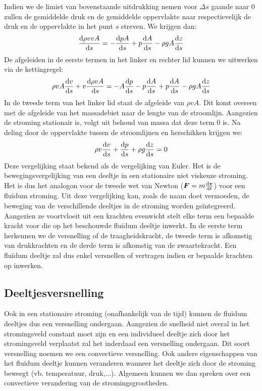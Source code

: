 Indien we de limiet van bovenstaande uitdrukking nemen voor $\Delta s$ gaande naar $0$ zullen de gemiddelde druk en de gemiddelde oppervlakte naar respectievelijk de druk en de oppervlakte in het punt $s$ streven. We krijgen dan:
\begin{equation}
	\frac{\mathrm{d} \rho v v A}{\mathrm{d} s} = -\frac{\mathrm{d} p A}{\mathrm{d} s} + p \frac{\mathrm{d} A}{\mathrm{d} s} -\rho g A \frac{\mathrm{d} z}{\mathrm{d} s}
\end{equation}
De afgeleiden in de eerste termen in het linker en rechter lid kunnen we uitwerken via de kettingregel:
\begin{equation}
	\rho v A \frac{\mathrm{d} v}{\mathrm{d} s} +  v \frac{\mathrm{d} \rho v A}{\mathrm{d} s} = -A \frac{\mathrm{d} p}{\mathrm{d} s} - p\frac{\mathrm{d} A}{\mathrm{d} s} + p \frac{\mathrm{d} A}{\mathrm{d} s} -\rho g A \frac{\mathrm{d} z}{\mathrm{d} s}
\end{equation}
In de tweede term van het linker lid staat de afgeleide van $\rho v A$. Dit komt overeen met de afgeleide van het massadebiet naar de lengte van de stroomlijn. Aangezien de stroming stationair is, volgt uit behoud van massa dat deze term $0$ is. Na deling door de oppervlakte tussen de stroomlijnen en herschikken krijgen we:
\begin{equation}
	\rho v \frac{\mathrm{d} v}{\mathrm{d} s} + \frac{\mathrm{d} p}{\mathrm{d} s} + \rho g \frac{\mathrm{d} z}{\mathrm{d} s} = 0
	\label{eqn:vergelijking van Euler}
\end{equation}
Deze vergelijking staat bekend als de vergelijking van Euler. Het is de bewegingsvergelijking van een deeltje in een stationaire niet viskeuze stroming. Het is dus het analogon voor de tweede wet van Newton ($\boldsymbol{F} = m \frac{\mathrm{d} \boldsymbol{v}}{\mathrm{d} t}$) voor een fluïdum stroming. Uit deze vergelijking kan, zoals de naam doet vermoeden, de beweging van de verschillende deeltjes in de stroming worden geïntegreerd. Aangezien ze voortvloeit uit een krachten evenwicht stelt elke term een bepaalde kracht voor die op het beschouwde fluïdum deeltje inwerkt. In de eerste term herkennen we de versnelling of de traagheidskracht, de tweede term is afkomstig van drukkrachten en de derde term is afkomstig van de zwaartekracht. Een fluïdum deeltje zal dus enkel versnellen of vertragen indien er bepaalde krachten op inwerken.

		\subsection{Deeltjesversnelling}
Ook in een stationaire stroming (onafhankelijk van de tijd) kunnen de fluïdum deeltjes dus een versnelling ondergaan. Aangezien de snelheid niet overal in het stromingsveld constant moet zijn en een individueel deeltje zich door het stromingsveld verplaatst zal het inderdaad een versnelling ondergaan. Dit soort versnelling noemen we een convectieve versnelling. Ook andere eigenschappen van het fluïdum deeltje kunnen veranderen wanneer het deeltje zich door de stroming beweegt (vb. temperatuur, druk,...). Algemeen kunnen we dan spreken over een convectieve verandering van de stromingsgrootheden.


